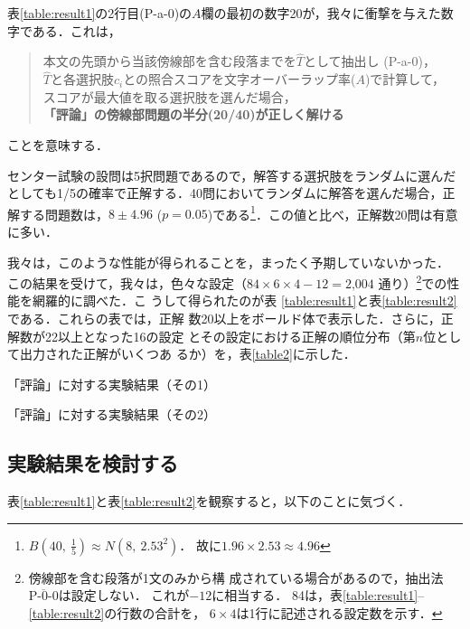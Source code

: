 \documentclass[japanese]{jnlp_1.4}
\begin{document}
表\ref{table:result1}の2行目(P-a-0)の$A$欄の最初の数字20が，我々に衝撃を与えた数
字である．これは，
\begin{quote}
本文の先頭から当該傍線部を含む段落までを$\widehat{T}$として抽出し
(P-a-0)，\\
$\widehat{T}$と各選択肢$c_i$との照合スコアを文字オーバーラップ率($A$)で計算して，\\
スコアが最大値を取る選択肢を選んだ場合，\\
{\bf 「評論」の傍線部問題の半分(20/40)が正しく解ける}
\end{quote}
ことを意味する．


センター試験の設問は5択問題であるので，解答する選択肢をランダムに選んだ
としても1/5の確率で正解する．40問においてランダムに解答を選んだ場合，正
解する問題数は，$8\pm 4.96$ ($p=0.05$)である\footnote{
$\displaystyle B\left(40,\ \frac{1}{5}\right) \approx N\left(8, \ 2.53^2\right)$．
故に$1.96\times2.53\approx4.96$
}．この値と比べ，正解数20問は有意に多い．

我々は，このような性能が得られることを，まったく予期していないかった．
この結果を受けて，我々は，色々な設定（$84 \times 6 \times 4 -12 = \mbox{2,004}$
通り）\footnote{傍線部を含む段落が1文のみから構
成されている場合があるので，抽出法$\overline{\mbox{P-0-0}}$は設定しない．
これが$-12$に相当する．
84は，表\ref{table:result1}--\ref{table:result2}の行数の合計を，
$6\times4$は1行に記述される設定数を示す．}での性能を網羅的に調べた．こ
うして得られたのが表
\ref{table:result1}と表\ref{table:result2}である．これらの表では，正解
数20以上をボールド体で表示した．さらに，正解数が22以上となった16の設定
とその設定における正解の順位分布（第$n$位として出力された正解がいくつあ
るか）を，表\ref{table2}に示した．

\begin{table}[p]
\caption{「評論」に対する実験結果（その1）}
\label{table:result1}

\end{table}

\clearpage

\begin{table}[t]
\caption{「評論」に対する実験結果（その2）}
\label{table:result2}

\end{table}

\subsection{実験結果を検討する}

表\ref{table:result1}と表\ref{table:result2}を観察すると，以下のことに気づく．
\end{document}
